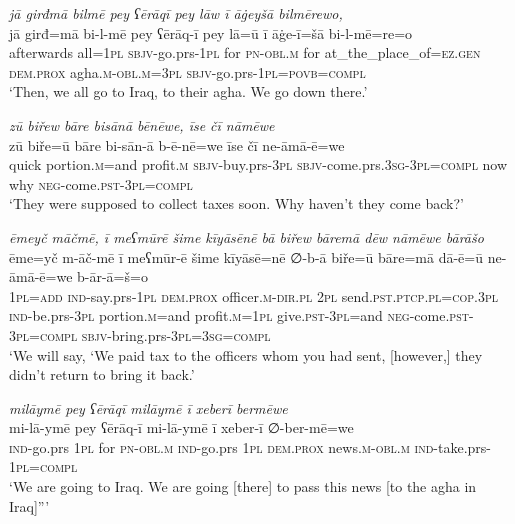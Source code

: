 \ea \label{BP.56}
\textit{jā girđmā bilmē pey ʕērāqī pey lāw ī āġeyšā bilmērewo,} \\ 
\gll jā girđ=mā bi-l-mē pey ʕērāq-ī pey lā=ū ī āġe-ī=šā bi-l-mē=re=o \\ 
 afterwards all\textsc{=\textsc{1pl}} \textsc{sbjv-}go.prs\textsc{-\textsc{1pl}} for \textsc{pn}\textsc{-obl}\textsc{.m} for at\_the\_place\_of\textsc{=ez.gen} \textsc{dem.prox} agha\textsc{.m}\textsc{-obl}\textsc{.m}\textsc{=3pl} \textsc{sbjv-}go.prs\textsc{-\textsc{1pl}}\textsc{=\textsc{povb}}\textsc{=compl} \\ 
\glt `Then, we all go to Iraq, to their agha. We go down there.'
\z 
 
\ea \label{BP.58}
\textit{zū biřew bāre bisānā bēnēwe, īse čī nāmēwe} \\ 
\gll zū biře=ū bāre bi-sān-ā b-ē-nē=we īse čī ne-āmā-ē=we \\ 
 quick portion\textsc{.m}=and profit\textsc{.m} \textsc{sbjv-}buy.prs\textsc{-3pl} \textsc{sbjv-}come.prs\textsc{.3sg}\textsc{-3pl}\textsc{=compl} now why \textsc{neg-}come\textsc{.pst}\textsc{-3pl}\textsc{=compl} \\ 
\glt `They were supposed to collect taxes soon. Why haven’t they come back?'
\z 
 
\ea \label{BP.60}
\textit{ēmeyč māčmē, ī meʕmūrē šime kīyāsēnē bā biřew bāremā dēw nāmēwe bārāšo} \\ 
\gll ēme=yč m-āč-mē ī meʕmūr-ē šime kīyāsē=nē ∅-b-ā biře=ū bāre=mā dā-ē=ū ne-āmā-ē=we b-ār-ā=š=o \\ 
 \textsc{1pl}\textsc{=add} \textsc{ind-}say.prs\textsc{-\textsc{1pl}} \textsc{dem.prox} officer\textsc{.m}\textsc{-dir}\textsc{.pl} \textsc{2pl} send\textsc{.pst}\textsc{.ptcp}\textsc{.pl}\textsc{=cop}\textsc{.3pl} \textsc{ind-}be.prs\textsc{-3pl} portion\textsc{.m}=and profit\textsc{.m}\textsc{=\textsc{1pl}} give\textsc{.pst}\textsc{-3pl}=and \textsc{neg-}come\textsc{.pst}\textsc{-3pl}\textsc{=compl} \textsc{sbjv-}bring.prs\textsc{-3pl}\textsc{=3sg}\textsc{=compl} \\ 
\glt `We will say, ‘We paid tax to the officers whom you had sent, [however,] they didn’t return to bring it back.'
\z 
 
\ea \label{BP.79}
\textit{milāymē pey ʕērāqī milāymē ī xeberī bermēwe} \\ 
\gll mi-lā-ymē pey ʕērāq-ī mi-lā-ymē ī xeber-ī ∅-ber-mē=we \\ 
 \textsc{ind-}go.prs \textsc{1pl} for \textsc{pn}\textsc{-obl}\textsc{.m} \textsc{ind-}go.prs \textsc{1pl} \textsc{dem.prox} news\textsc{.m}\textsc{-obl}\textsc{.m} \textsc{ind-}take.prs\textsc{-\textsc{1pl}}\textsc{=compl} \\ 
\glt `We are going to Iraq. We are going [there] to pass this news [to the agha in Iraq]”'
\z 
 

